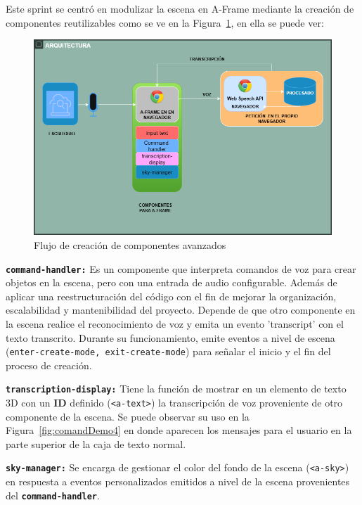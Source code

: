 \documentclass[a4paper, 12pt]{book}
\begin{document}
Este sprint se centró en modulizar la escena en A-Frame mediante la creación de componentes reutilizables como se ve en la Figura~\ref{fig:componente2}, en ella se puede ver:
\begin{figure}[H]  %
  \centering
  \includegraphics[width=0.7\linewidth]{img/componentes2.png}  %
  \caption{Flujo de creación de componentes avanzados}  %
  \label{fig:componente2}  %
\end{figure} 
\texttt{\textbf{command-handler:}} Es un componente que interpreta comandos de voz para crear objetos en la escena, pero con una entrada de audio configurable.
Además de aplicar una reestructuración del código con el fin de mejorar la organización, escalabilidad y mantenibilidad del proyecto.
Depende de que otro componente en la escena realice el reconocimiento de voz y emita un evento 'transcript' con el texto transcrito.
Durante su funcionamiento, emite eventos a nivel de escena (\texttt{enter-create-mode, exit-create-mode}) para señalar el inicio y el fin del proceso de creación.

\texttt{\textbf{transcription-display:}} Tiene la función de mostrar en un elemento de texto 3D con un \textbf{ID} definido (\texttt{<a-text>}) la transcripción de voz proveniente de otro componente de la escena.
Se puede observar su uso en la Figura~\ref{fig:comandDemo4} en donde aparecen los mensajes para el usuario en la parte superior de la caja de texto normal.


\texttt{\textbf{sky-manager:}} Se encarga de gestionar el color del fondo de la escena (\texttt{<a-sky>}) en respuesta a eventos personalizados emitidos a nivel de la escena provenientes del \texttt{\textbf{command-handler}}.
\end{document}
